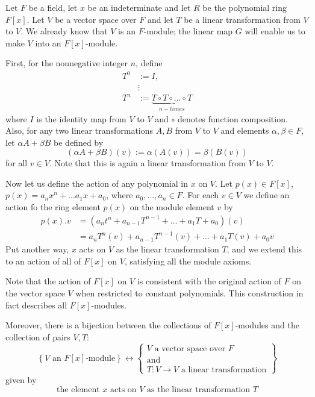\documentclass[12pt, a4paper, oneside, openright, titlepage]{book}
\begin{document}
\begin{eg}[(F{[x]}-modules)]
    Let $F$ be a field, let $x$ be an indeterminate and let $R$ be the polynomial ring $F[x]$. Let $V$ be a vector space over $F$ and let $T$ be a linear transformation from $V$ to $V$. We already know that $V$ is an $F$-module; the linear map $G$ will enable us to make $V$ into an $F[x]$-module.

    First, for the nonnegative integer $n$, define \begin{align*}
        T^0 &:= I, \\
        &\vdots \\
        T^n &:= \underbrace{T\circ T\circ ...\circ T}_{n-times}
    \end{align*}
    where $I$ is the identity map from $V$ to $V$ and $\circ$ denotes function composition. Also, for any two linear transformations $A, B$ from $V$ to $V$ and elements $\alpha,\beta \in F$, let $\alpha A+\beta B$ be defined by \begin{equation*}
        (\alpha A + \beta B)(v) := \alpha(A(v)) = \beta(B(v))
    \end{equation*}
    for all $v \in V$. Note that this is again a linear transformation from $V$ to $V$.


    Now let us define the action of any polynomial in $x$ on $V$. Let $p(x) \in F[x]$, $p(x) = a_nx^n+...a_1x+a_0$, where $a_0,...,a_n \in F$. For each $v \in V$ we define an action fo the ring element $p(x)$ on the module element $v$ by \begin{align*}
        p(x).v &= (a_nt^n+a_{n-1}T^{n-1}+...+a_1T+a_0)(v) \\
        &= a_nT^n(v) + a_{n-1}T^{n-1}(v) + ... + a_1T(v) + a_0v
    \end{align*}
    Put another way, $x$ acts on $V$ as the linear transformation $T$, and we extend this to an action of all of $F[x]$ on $V$, satisfying all the module axioms.

    Note that the action of $F[x]$ on $V$ is consistent with the original action of $F$ on the vector space $V$ when restricted to constant polynomials. This construction in fact describes all $F[x]$-modules.

    Moreover, there is a bijection between the collections of $F[x]$-modules and the collection of pairs $V,T$: \begin{equation*}
        \left\{V\text{ an }F[x]\text{-module}\right\} \leftrightarrow \left\{\begin{array}{c} V\text{ a vector space over } F \\ \text{and} \\ T:V\rightarrow V\text{ a linear transformation}\end{array}\right\}
    \end{equation*}
    given by \begin{equation*}
        \text{the element $x$ acts on $V$ as the linear transformation $T$}
    \end{equation*}


\end{eg}
\end{document}
